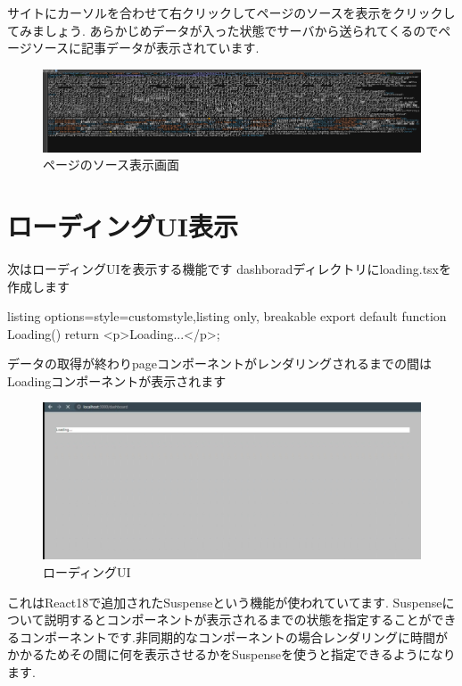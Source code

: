サイトにカーソルを合わせて右クリックしてページのソースを表示をクリックしてみましょう.
あらかじめデータが入った状態でサーバから送られてくるのでページソースに記事データが表示されています.

\begin{figure}[H]
  \centering
  \includegraphics[width=12cm]{./image/03-Tech/chap4/05.png}
  \caption{ページのソース表示画面}
\end{figure}

\section{ローディングUI表示}

次はローディングUIを表示する機能です
dashboradディレクトリにloading.tsxを作成します

\begin{tcblisting}{listing options={style=customstyle},listing only, breakable}
  export default function Loading() {
      return <p>Loading...</p>;
    }
\end{tcblisting}


データの取得が終わりpageコンポーネントがレンダリングされるまでの間はLoadingコンポーネントが表示されます

\begin{figure}[H]
  \centering
  \includegraphics[width=12cm]{./image/03-Tech/chap4/07.png}
  \caption{ローディングUI}
\end{figure}




これはReact18で追加されたSuspenseという機能が使われていてます.
Suspenseについて説明するとコンポーネントが表示されるまでの状態を指定することができるコンポーネントです.非同期的なコンポーネントの場合レンダリングに時間がかかるためその間に何を表示させるかをSuspenseを使うと指定できるようになります.

